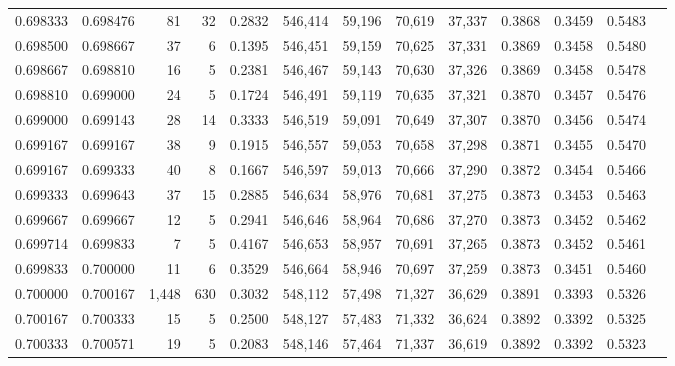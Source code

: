\begin{tabular}{rrrrrrrrrrrrr}
0.698333 & 0.698476 &    81 &  32 &                                     0.2832 & 546,414 &  59,196 &  70,619 &  37,337 & 0.3868 & 0.3459 & 0.5483 \\
0.698500 & 0.698667 &    37 &   6 &                                     0.1395 & 546,451 &  59,159 &  70,625 &  37,331 & 0.3869 & 0.3458 & 0.5480 \\
0.698667 & 0.698810 &    16 &   5 &                                     0.2381 & 546,467 &  59,143 &  70,630 &  37,326 & 0.3869 & 0.3458 & 0.5478 \\
0.698810 & 0.699000 &    24 &   5 &                                     0.1724 & 546,491 &  59,119 &  70,635 &  37,321 & 0.3870 & 0.3457 & 0.5476 \\
0.699000 & 0.699143 &    28 &  14 &                                     0.3333 & 546,519 &  59,091 &  70,649 &  37,307 & 0.3870 & 0.3456 & 0.5474 \\
0.699167 & 0.699167 &    38 &   9 &                                     0.1915 & 546,557 &  59,053 &  70,658 &  37,298 & 0.3871 & 0.3455 & 0.5470 \\
0.699167 & 0.699333 &    40 &   8 &                                     0.1667 & 546,597 &  59,013 &  70,666 &  37,290 & 0.3872 & 0.3454 & 0.5466 \\
0.699333 & 0.699643 &    37 &  15 &                                     0.2885 & 546,634 &  58,976 &  70,681 &  37,275 & 0.3873 & 0.3453 & 0.5463 \\
0.699667 & 0.699667 &    12 &   5 &                                     0.2941 & 546,646 &  58,964 &  70,686 &  37,270 & 0.3873 & 0.3452 & 0.5462 \\
0.699714 & 0.699833 &     7 &   5 &                                     0.4167 & 546,653 &  58,957 &  70,691 &  37,265 & 0.3873 & 0.3452 & 0.5461 \\
0.699833 & 0.700000 &    11 &   6 &                                     0.3529 & 546,664 &  58,946 &  70,697 &  37,259 & 0.3873 & 0.3451 & 0.5460 \\
0.700000 & 0.700167 & 1,448 & 630 &                                     0.3032 & 548,112 &  57,498 &  71,327 &  36,629 & 0.3891 & 0.3393 & 0.5326 \\
0.700167 & 0.700333 &    15 &   5 &                                     0.2500 & 548,127 &  57,483 &  71,332 &  36,624 & 0.3892 & 0.3392 & 0.5325 \\
0.700333 & 0.700571 &    19 &   5 &                                     0.2083 & 548,146 &  57,464 &  71,337 &  36,619 & 0.3892 & 0.3392 & 0.5323 \\

\end{tabular}
